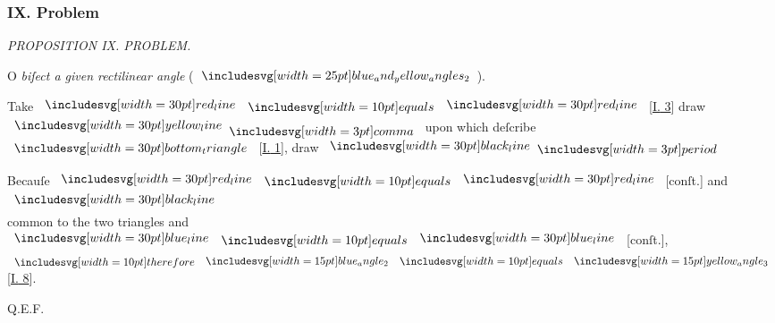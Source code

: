 \documentclass[12pt,preview]{standalone}
\begin{document}
\subsubsection{IX. Problem}

\begin{minipage}[t]{0.64\textwidth}
    \vspace{0pt}

    \begin{center}
        \textit{PROPOSITION IX. PROBLEM.}\label{book1pr9} \\
    \end{center}

    \hfill

    \begin{center}
        \raggedright \lettrine[lines=4, loversize=1, nindent=0pt]{}{}O \textit{biſect a given rectilinear angle} (\hspace{-1ex}$\img{blue_and_yellow_angles_2}$\hspace{-1ex}).
    \end{center}

    \hfill

    \hfill

    \hfill

    \hfill

    {\vspace{1ex}\begin{center}
            Take $\redline \bequals \redline$ [\hyperref[book1pr3]{\textsc{I.} 3}] draw $\yellowline \bcomma$ upon which deſcribe $\img[0][0][30]{bottom_triangle}$ [\hyperref[book1pr1]{\textsc{I.} 1}], draw $\blackline \bperiod$
        \end{center}}

    \hfill

    \hfill

    \begin{center}
        Becauſe $\redline \bequals \redline$ [conſt.] and $\blackline$\\
        common to the two triangles and $\blueline \bequals \blueline$ [conſt.],\\
        $\btherefore \img[0][0][15]{blue_angle_2} \bequals \img[0][0][15]{yellow_angle_3}$ [\hyperref[book1pr8]{\textsc{I.} 8}].
    \end{center}

    \hfill

    \hfill Q.E.F.
\end{minipage}%
\hfill
\begin{minipage}[t]{0.33\textwidth}
    \vspace{40pt}
    
\end{minipage}
\end{document}
